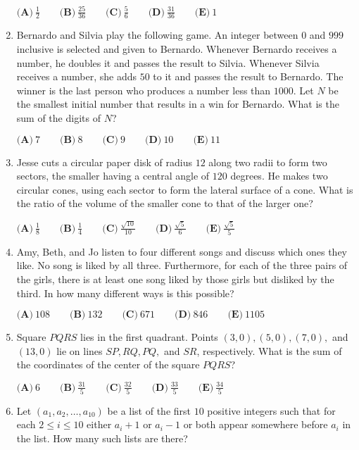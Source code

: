 \documentclass{article}
\begin{document}
\begin{enumerate}[label=\arabic*., itemsep=0.5em]
\(\textbf{(A)}\ \frac{1}{2}\qquad\textbf{(B)}\ \frac{25}{36}\qquad\textbf{(C)}\ \frac{5}{6}\qquad\textbf{(D)}\ \frac{31}{36}\qquad\textbf{(E)}\ 1 \)\par \vspace{0.5em}\item Bernardo and Silvia play the following game. An integer between \(0\) and \(999\) inclusive is selected and given to Bernardo. Whenever Bernardo receives a number, he doubles it and passes the result to Silvia. Whenever Silvia receives a number, she adds \(50\) to it and passes the result to Bernardo. The winner is the last person who produces a number less than \(1000\). Let \(N\) be the smallest initial number that results in a win for Bernardo. What is the sum of the digits of \(N\)?

\( \textbf{(A)}\ 7\qquad\textbf{(B)}\ 8\qquad\textbf{(C)}\ 9\qquad\textbf{(D)}\ 10\qquad\textbf{(E)}\ 11 \)\par \vspace{0.5em}\item Jesse cuts a circular paper disk of radius \(12\) along two radii to form two sectors, the smaller having a central angle of \(120\) degrees. He makes two circular cones, using each sector to form the lateral surface of a cone. What is the ratio of the volume of the smaller cone to that of the larger one?

\(\textbf{(A)}\ \frac{1}{8}\qquad\textbf{(B)}\ \frac{1}{4}\qquad\textbf{(C)}\ \frac{\sqrt{10}}{10}\qquad\textbf{(D)}\ \frac{\sqrt{5}}{6}\qquad\textbf{(E)}\ \frac{\sqrt{5}}{5}\)\par \vspace{0.5em}\item Amy, Beth, and Jo listen to four different songs and discuss which ones they like. No song is liked by all three. Furthermore, for each of the three pairs of the girls, there is at least one song liked by those girls but disliked by the third. In how many different ways is this possible?

\(\textbf{(A)}\ 108\qquad\textbf{(B)}\ 132\qquad\textbf{(C)}\ 671\qquad\textbf{(D)}\ 846\qquad\textbf{(E)}\ 1105 \)\par \vspace{0.5em}\item Square \(PQRS\) lies in the first quadrant. Points \((3,0), (5,0), (7,0),\) and \((13,0)\) lie on lines \(SP, RQ, PQ,\) and \(SR\), respectively. What is the sum of the coordinates of the center of the square \(PQRS\)?

\(\textbf{(A)}\ 6\qquad\textbf{(B)}\ \frac{31}{5}\qquad\textbf{(C)}\ \frac{32}{5}\qquad\textbf{(D)}\ \frac{33}{5}\qquad\textbf{(E)}\ \frac{34}{5} \)\par \vspace{0.5em}\item Let \((a_1,a_2, \dots ,a_{10})\) be a list of the first \(10\) positive integers such that for each \(2 \le i \le 10\) either \(a_i+1\) or \(a_i-1\) or both appear somewhere before \(a_i\) in the list. How many such lists are there?


\end{enumerate}
\end{document}
